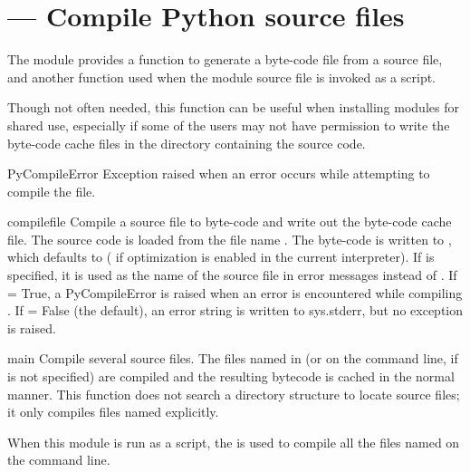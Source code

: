 \section{ ---
         Compile Python source files}





The  module provides a function to generate a
byte-code file from a source file, and another function used when the
module source file is invoked as a script.

Though not often needed, this function can be useful when installing
modules for shared use, especially if some of the users may not have
permission to write the byte-code cache files in the directory
containing the source code.

\begin{excdesc}{PyCompileError}
Exception raised when an error occurs while attempting to compile the file.
\end{excdesc}

\begin{funcdesc}{compile}{file}
  Compile a source file to byte-code and write out the byte-code cache 
  file.  The source code is loaded from the file name .  The 
  byte-code is written to , which defaults to 
  \code{+}  ( if optimization is enabled in the
  current interpreter).  If  is specified, it is used as
  the name of the source file in error messages instead of . 
  If  = True, a PyCompileError is raised when an error is 
  encountered while compiling . If  = False (the default), 
  an error string is written to sys.stderr, but no exception is raised.
\end{funcdesc}

\begin{funcdesc}{main}{}
  Compile several source files.  The files named in  (or on
  the command line, if  is not specified) are compiled and
  the resulting bytecode is cached in the normal manner.  This
  function does not search a directory structure to locate source
  files; it only compiles files named explicitly.
\end{funcdesc}

When this module is run as a script, the  is used to
compile all the files named on the command line.

\begin{seealso}
\end{seealso}
